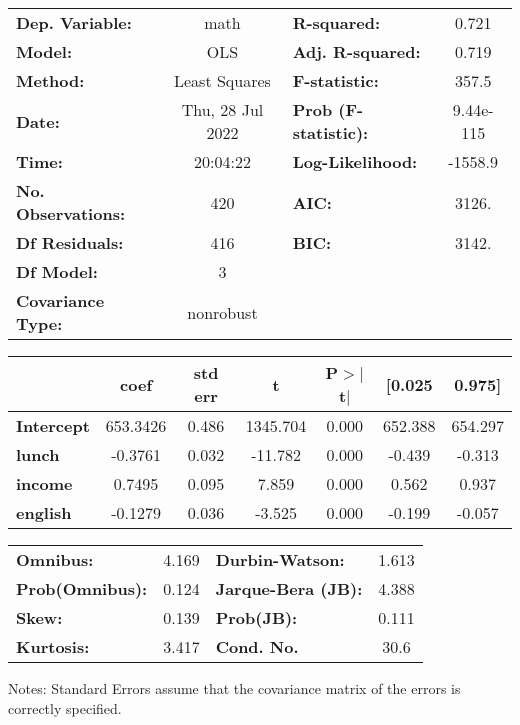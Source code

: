 \begin{center}
\begin{tabular}{lclc}
\toprule
\textbf{Dep. Variable:}    &       math       & \textbf{  R-squared:         } &     0.721   \\
\textbf{Model:}            &       OLS        & \textbf{  Adj. R-squared:    } &     0.719   \\
\textbf{Method:}           &  Least Squares   & \textbf{  F-statistic:       } &     357.5   \\
\textbf{Date:}             & Thu, 28 Jul 2022 & \textbf{  Prob (F-statistic):} & 9.44e-115   \\
\textbf{Time:}             &     20:04:22     & \textbf{  Log-Likelihood:    } &   -1558.9   \\
\textbf{No. Observations:} &         420      & \textbf{  AIC:               } &     3126.   \\
\textbf{Df Residuals:}     &         416      & \textbf{  BIC:               } &     3142.   \\
\textbf{Df Model:}         &           3      & \textbf{                     } &             \\
\textbf{Covariance Type:}  &    nonrobust     & \textbf{                     } &             \\
\bottomrule
\end{tabular}
\begin{tabular}{lcccccc}
                   & \textbf{coef} & \textbf{std err} & \textbf{t} & \textbf{P$> |$t$|$} & \textbf{[0.025} & \textbf{0.975]}  \\
\midrule
\textbf{Intercept} &     653.3426  &        0.486     &  1345.704  &         0.000        &      652.388    &      654.297     \\
\textbf{lunch}     &      -0.3761  &        0.032     &   -11.782  &         0.000        &       -0.439    &       -0.313     \\
\textbf{income}    &       0.7495  &        0.095     &     7.859  &         0.000        &        0.562    &        0.937     \\
\textbf{english}   &      -0.1279  &        0.036     &    -3.525  &         0.000        &       -0.199    &       -0.057     \\
\bottomrule
\end{tabular}
\begin{tabular}{lclc}
\textbf{Omnibus:}       &  4.169 & \textbf{  Durbin-Watson:     } &    1.613  \\
\textbf{Prob(Omnibus):} &  0.124 & \textbf{  Jarque-Bera (JB):  } &    4.388  \\
\textbf{Skew:}          &  0.139 & \textbf{  Prob(JB):          } &    0.111  \\
\textbf{Kurtosis:}      &  3.417 & \textbf{  Cond. No.          } &     30.6  \\
\bottomrule
\end{tabular}
\end{center}

Notes: \newline
 [1] Standard Errors assume that the covariance matrix of the errors is correctly specified.